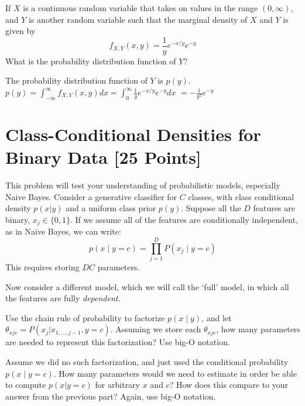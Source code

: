 \vspace{0.5cm}

\problem[0] If $X$ is a continuous random variable that takes on values in the range $(0,\infty)$, and $Y$ is another random variable such that the marginal density of $X$ and $Y$ is given by
\[f_{X,Y}(x,y) = \frac{1}{y} e^{-x/y}e^{-y}\]
What is the probability distribution function of $Y$? \\

\begin{solution}
  The probability distribution function of $Y$ is $p(y)$. $p(y) = \int_{-\infty}^{\infty} f_{X,Y}(x,y) dx = \int_{0}^{\infty} \frac{1}{y} e^{-x/y}e^{-y} dx$
  $= -\frac{1}{y^2}e^{-y}$
\end{solution}

\newpage


\section{Class-Conditional Densities for Binary Data [25 Points]}
This problem will test your understanding of probabilistic models, especially Naive Bayes.
Consider a generative classifier for $C$ classes, with class conditional density $p(x | y)$ and a uniform class prior $p(y)$. Suppose all the $D$ features are binary, $x_j \in \{0, 1 \}$. If we assume all of the features are conditionally independent, as in Naive Bayes, we can write:
$$p(x \mid y = c) = \prod_{j=1}^D P(x_j \mid y = c) $$
This requires storing $DC$ parameters. 

Now consider a different model, which we will call the `full' model, in which all the features are fully \textit{dependent}.

\problem[5]Use the chain rule of probability to factorize $p(x \mid y)$, and let $\theta_{xjc} = P(x_j | x_{1, \ldots, j - 1}, y = c)$. Assuming we store each $\theta_{xjc}$, how many parameters are needed to represent this factorization? Use big-O notation.

\begin{solution} %
\end{solution}

\problem[5] Assume we did no such factorization, and just used the conditional probability $p(x \mid y = c)$. How many parameters would we need to estimate in order be able to compute $p(x | y = c)$ for arbitrary $x$ and $c$? How does this compare to your answer from the previous part? Again, use big-O notation.

